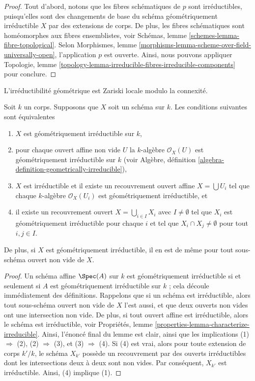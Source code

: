 \begin{proof}
Tout d'abord, notons que les fibres schématiques de $p$
sont irréductibles, puisqu'elles sont des changements de
base du schéma géométriquement irréductible $X$ par des
extensions de corps. De plus, les fibres schématiques
sont homéomorphes aux fibres ensemblistes, voir Schémas,
lemme \ref{schemes-lemma-fibre-topological}. Selon
Morphismes, lemme
\ref{morphisms-lemma-scheme-over-field-universally-open}, l'application
$p$ est ouverte. Ainsi, nous pouvons appliquer Topologie, lemme
\ref{topology-lemma-irreducible-fibres-irreducible-components} pour conclure.
\end{proof}

\begin{lemma}
\label{lemma-geometrically-irreducible-local}
\begin{slogan}
L'irréductibilité géométrique est Zariski locale modulo la connexité.
\end{slogan}
Soit $k$ un corps. Supposons que $X$ soit
un schéma sur $k$. Les conditions suivantes sont équivalentes
\begin{enumerate}
\item $X$ est géométriquement irréductible sur $k$, \item
pour chaque ouvert affine non vide $U$ la $k$-algèbre
$\mathcal{O}_X(U)$ est géométriquement irréductible sur $k$
(voir Algèbre, définition
\ref{algebra-definition-geometrically-irreducible}), \item $X$
est irréductible et il existe un recouvrement ouvert affine $X =
\bigcup U_i$ tel que chaque $k$-algèbre $\mathcal{O}_X(U_i)$ est
géométriquement irréductible, et \item il existe un recouvrement
ouvert $X = \bigcup_{i \in I} X_i$ avec $I \not = \emptyset$
tel que $X_i$ est géométriquement irréductible pour chaque $i$ et
tel que $X_i \cap X_j \not = \emptyset$ pour tout $i, j \in I$.
\end{enumerate}
De plus, si $X$ est géométriquement irréductible, il en
est de même pour tout sous-schéma ouvert non vide de $X$.
\end{lemma}

\begin{proof}
Un schéma affine $\Spec(A)$ sur $k$ est géométriquement
irréductible si et seulement si $A$ est géométriquement
irréductible sur $k$ ; cela découle immédiatement des
définitions. Rappelons que si un schéma est irréductible, alors
tout sous-schéma ouvert non vide de $X$ l'est aussi, et que deux
ouverts non vides ont une intersection non vide. De plus, si tout
ouvert affine est irréductible, alors le schéma est irréductible,
voir Propriétés, lemme
\ref{properties-lemma-characterize-irreducible}. Ainsi, l'énoncé final du
lemme est clair, ainsi que les implications (1) $\Rightarrow$ (2), (2)
$\Rightarrow$ (3), et (3) $\Rightarrow$ (4). Si (4) est vrai, alors pour
toute extension de corps $k'/k$, le schéma $X_{k'}$ possède un recouvrement
par des ouverts irréductibles dont les intersections deux à deux sont non
vides. Par conséquent, $X_{k'}$ est irréductible. Ainsi, (4) implique (1).
\end{proof}

